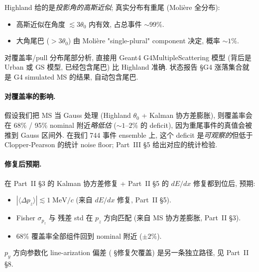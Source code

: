 Highland 给的是\emph{投影角的高斯近似}; 真实分布有重尾 (Molière 全分布):
\begin{itemize}[nosep, leftmargin=2em]
  \item 高斯近似在角度 $\lesssim 3 \theta_0$ 内有效, 占总事件 $\sim 99\%$.
  \item 大角尾巴 ($> 3\theta_0$) 由 Molière "single-plural" component 决定, 概率 $\sim 1\%$.
\end{itemize}
对覆盖率/pull 分布尾部分析, 直接用 Geant4 G4MultipleScattering 模型 (背后是 Urban 或 GS 模型, 已经包含尾巴) 比 Highland 准确. 状态报告 §G4 涨落集合就是 G4 simulated MS 的结果, 自动包含尾巴.

\paragraph{对覆盖率的影响.} 假设我们把 MS 当 Gauss 处理 (Highland $\theta_0$ + Kalman 协方差膨胀), 则覆盖率会在 68\% / 95\% nominal 附近\emph{略低估} ($\sim 1$--$2\%$ 的 deficit), 因为重尾事件的真值会被推到 Gauss 区间外. 在我们 744 事件 ensemble 上, 这个 deficit 是\emph{可观察的}但低于 Clopper-Pearson 的统计 noise floor; Part~III §5 给出对应的统计检验.

\paragraph{修复后预期.} 在 Part~II §3 的 Kalman 协方差修复 + Part~II §5 的 $dE/dx$ 修复都到位后, 预期:
\begin{itemize}[nosep, leftmargin=2em]
  \item $|\langle \Delta p_z \rangle| \lesssim 1\;\mathrm{MeV}/c$ (来自 $dE/dx$ 修复, Part~II §5).
  \item Fisher $\sigma_{p_z}$ 与 残差 std 在 $p_z$ 方向匹配 (来自 MS 协方差膨胀, Part~II §3).
  \item 68\% 覆盖率全部组件回到 nominal 附近 ($\pm 2\%$).
\end{itemize}
$p_y$ 方向参数化 line-arization 偏差 (\StatusReport{} §修复欠覆盖) 是另一条独立路径, 见 Part~II §8.

